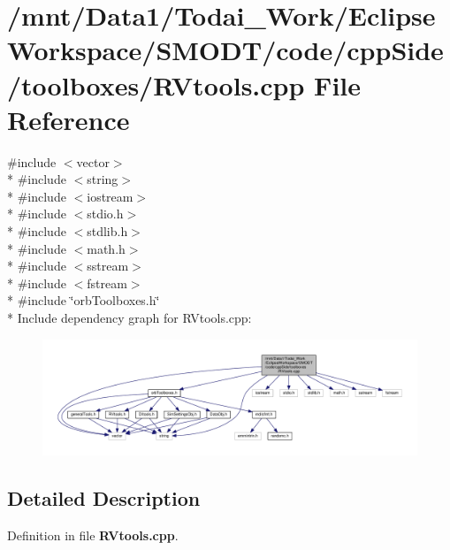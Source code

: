 \section{/mnt/\-Data1/\-Todai\-\_\-\-Work/\-Eclipse\-Workspace/\-S\-M\-O\-D\-T/code/cpp\-Side/toolboxes/\-R\-Vtools.cpp File Reference}
\label{_r_vtools_8cpp}
{\ttfamily \#include $<$vector$>$}\\*
{\ttfamily \#include $<$string$>$}\\*
{\ttfamily \#include $<$iostream$>$}\\*
{\ttfamily \#include $<$stdio.\-h$>$}\\*
{\ttfamily \#include $<$stdlib.\-h$>$}\\*
{\ttfamily \#include $<$math.\-h$>$}\\*
{\ttfamily \#include $<$sstream$>$}\\*
{\ttfamily \#include $<$fstream$>$}\\*
{\ttfamily \#include \char`\"{}orb\-Toolboxes.\-h\char`\"{}}\\*
Include dependency graph for R\-Vtools.\-cpp\-:
\nopagebreak
\begin{figure}[H]
\begin{center}
\leavevmode
\includegraphics[width=350pt]{_r_vtools_8cpp__incl}
\end{center}
\end{figure}


\subsection{Detailed Description}


Definition in file {\bf R\-Vtools.\-cpp}.

